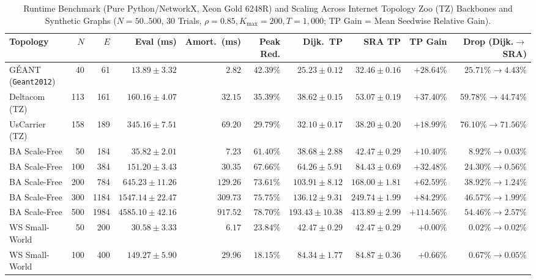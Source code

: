 \documentclass{ccjnl}
\newcommand{\rev}[1]{{\color{blue}#1}}
\def\rev#1{#1}%
\begin{document}
\begin{table}[t]
\centering
\scriptsize\setlength{\tabcolsep}{1.2pt}\renewcommand{\arraystretch}{0.95}
\caption{\rev{Runtime Benchmark (Pure Python/NetworkX, Xeon Gold 6248R) and Scaling Across Internet Topology Zoo (TZ) Backbones and Synthetic Graphs ($N=50..500$, 30 Trials, $\rho=0.85, K_{\max}=200, T=1{,}000$; TP Gain = Mean Seedwise Relative Gain).}}
\label{tab:scalability_table}
\begin{tabular*}{\textwidth}{@{\extracolsep{\fill}}lrrrrrrrrr@{}}
\toprule
\textbf{Topology} & \textbf{$N$} & \textbf{$E$} & \textbf{Eval (ms)} & \textbf{Amort.\ (ms)} & \textbf{Peak Red.} & \textbf{Dijk.\ TP} & \textbf{SRA TP} & \textbf{TP Gain} & \textbf{Drop (Dijk.$\to$SRA)} \\
\midrule
G\'EANT (\texttt{Geant2012}) & 40 & 61 & $13.89 \pm 3.32$ & $2.82$ & $42.39\%$ & $25.23 \pm 0.12$ & $32.46 \pm 0.16$ & $\mathbf{+28.64\%}$ & $25.71\% \to 4.43\%$ \\
Deltacom (TZ) & 113 & 161 & $160.16 \pm 4.07$ & $32.15$ & $35.39\%$ & $38.62 \pm 0.15$ & $53.07 \pm 0.19$ & $\mathbf{+37.40\%}$ & $59.78\% \to 44.74\%$ \\
UsCarrier (TZ) & 158 & 189 & $345.16 \pm 7.51$ & $69.20$ & $29.79\%$ & $32.10 \pm 0.17$ & $38.20 \pm 0.20$ & $\mathbf{+18.99\%}$ & $76.10\% \to 71.56\%$ \\
\midrule
BA Scale-Free & 50 & 184 & $35.82 \pm 2.01$ & $7.23$ & $61.40\%$ & $38.68 \pm 2.88$ & $42.47 \pm 0.29$ & $+10.40\%$ & $8.92\% \to 0.03\%$ \\
BA Scale-Free & 100 & 384 & $151.20 \pm 3.43$ & $30.35$ & $67.66\%$ & $64.26 \pm 5.91$ & $84.43 \pm 0.69$ & $+32.48\%$ & $24.30\% \to 0.56\%$ \\
BA Scale-Free & 200 & 784 & $645.23 \pm 11.26$ & $129.26$ & $73.61\%$ & $103.91 \pm 8.12$ & $168.00 \pm 1.81$ & $+62.59\%$ & $38.92\% \to 1.24\%$ \\
BA Scale-Free & 300 & 1184 & $1547.14 \pm 22.47$ & $309.73$ & $75.75\%$ & $136.12 \pm 9.31$ & $249.74 \pm 1.99$ & $+84.29\%$ & $46.57\% \to 1.99\%$ \\
BA Scale-Free & 500 & 1984 & $4585.10 \pm 42.16$ & $917.52$ & $78.70\%$ & $193.43 \pm 10.38$ & $413.89 \pm 2.99$ & $\mathbf{+114.56\%}$ & $\mathbf{54.46\% \to 2.57\%}$ \\
\midrule
WS Small-World & 50 & 200 & $30.58 \pm 3.33$ & $6.17$ & $23.84\%$ & $42.47 \pm 0.29$ & $42.47 \pm 0.29$ & $+0.00\%$ & $0.02\% \to 0.02\%$ \\
WS Small-World & 100 & 400 & $149.27 \pm 5.90$ & $29.96$ & $18.15\%$ & $84.34 \pm 1.77$ & $84.87 \pm 0.36$ & $+0.66\%$ & $0.67\% \to 0.05\%$ \\

\end{tabular*}
\end{table}
\end{document}
